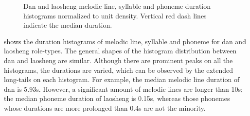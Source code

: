 \begin{figure}[ht!]
    \hfill
  
    \caption[]{Dan and laosheng melodic line, syllable and phoneme duration histograms normalized to unit density. Vertical red dash lines indicate the median duration.}
    \label{fig:ch4:dan_laosheng_histo}
\end{figure}

 shows the duration histograms of melodic line, syllable and phoneme for \gls{dan} and \gls{laosheng} role-types. The general shapes of the histogram distribution between \gls{dan} and \gls{laosheng} are similar. Although there are prominent peaks on all the histograms, the durations are varied, which can be observed by the extended long-tails on each histogram. For example, the median melodic line duration of \gls{dan} is 5.93s. However, a significant amount of melodic lines are longer than 10s; the median phoneme duration of \gls{laosheng} is 0.15s, whereas those phonemes whose durations are more prolonged than 0.4s are not the minority.

